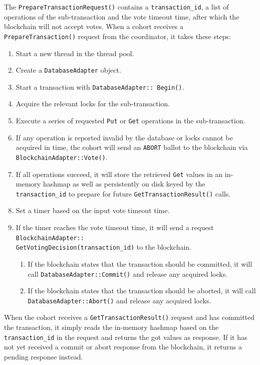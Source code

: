 \documentclass[11pt,sigplan,screen,nonacm]{acmart}
\begin{document}
The \texttt{PrepareTransactionRequest()} contains a \texttt{transaction\_id}, a list of operations of the sub-transaction and the vote timeout time, after which the blockchain will not accept votes. When a cohort receives a \texttt{PrepareTransaction()} request from the coordinator, it takes these steps: 
\begin{enumerate}
  \item Start a new thread in the thread pool.
  \item Create a \texttt{DatabaseAdapter} object.
  \item Start a transaction with \texttt{DatabaseAdapter:: Begin()}.
  \item Acquire the relevant locks for the sub-transaction.
  \item Execute a series of requested \texttt{Put} or \texttt{Get} operations in the sub-transaction. 
  \item If any operation is reported invalid by the database or locks cannot be acquired in time, the cohort will send an \texttt{ABORT} ballot to the blockchain via \texttt{BlockchainAdapter::Vote()}.
  \item If all operations succeed, it will store the retrieved \texttt{Get} values in an in-memory hashmap as well as persistently on disk keyed by the \texttt{transaction\_id} to prepare for future \texttt{GetTransactionResult()} calls.
  \item Set a timer based on the input vote timeout time.
  \item If the timer reaches the vote timeout time, it will send a request \texttt{BlockchainAdapter::\\GetVotingDecision(transaction\_id)} to the blockchain. 
    \begin{enumerate}
      \item If the blockchain states that the transaction should be committed, it will call \texttt{DatabaseAdapter::Commit()} and release any acquired locks.
  \item If the blockchain states that the transaction should be aborted, it will call \texttt{DatabaseAdapter::Abort()} and release any acquired locks.
  \end{enumerate}
\end{enumerate}

When the cohort receives a \texttt{GetTransactionResult()} request and has committed the transaction, it simply reads the in-memory hashmap based on the \texttt{transaction\_id} in the request and returns the got values as response. If it has not yet received a commit or abort response from the blockchain, it returns a pending response instead.
\end{document}
